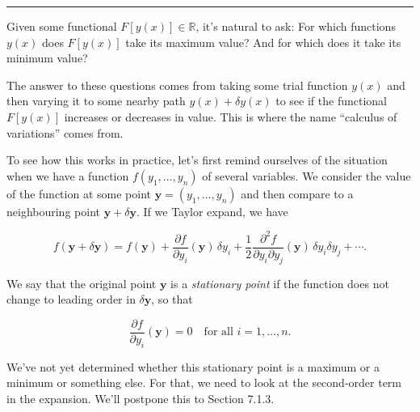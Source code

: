 \documentclass[11pt,a4paper,twoside]{article}
\newcommand{\pnum}[1]{\makebox[0pt][r]{\scriptsize\textbf{[#1]}\hspace{0.7em}}}
\begin{document}
\setcounter{page}{156}



\par\vspace{0.6em}\hrule\vspace{0.8em}

\noindent\pnum{1}Given some functional $F[y(x)]\in\mathbb{R}$, it's natural to ask: For which functions $y(x)$ does $F[y(x)]$ take its maximum value? And for which does it take its minimum value?




\noindent\pnum{2}The answer to these questions comes from taking some trial function $y(x)$ and then varying it to some nearby path $y(x)+\delta y(x)$ to see if the functional $F[y(x)]$ increases or decreases in value. This is where the name ``calculus of variations'' comes from.



\noindent\pnum{3}To see how this works in practice, let's first remind ourselves of the situation when we have a function $f(y_1,\ldots,y_n)$ of several variables. We consider the value of the function at some point $\mathbf{y}=(y_1,\ldots,y_n)$ and then compare to a neighbouring point $\mathbf{y}+\delta\mathbf{y}$. If we Taylor expand, we have

\begin{equation}
    f(\mathbf{y}+\delta\mathbf{y})=f(\mathbf{y})+\frac{\partial f}{\partial y_i}(\mathbf{y})\,\delta y_i+\frac12\frac{\partial^2 f}{\partial y_i\partial y_j}(\mathbf{y})\,\delta y_i\delta y_j+\cdots .\tag{7.5}
\end{equation}

\noindent\pnum{4}We say that the original point $\mathbf{y}$ is a \textit{stationary point} if the function does not change to leading order in $\delta\mathbf{y}$, so that

\begin{equation}
    \frac{\partial f}{\partial y_i}(\mathbf{y})=0\quad\text{for all }i=1,\ldots,n.\tag{7.6}
\end{equation}

\noindent\pnum{5}We've not yet determined whether this stationary point is a maximum or a minimum or something else. For that, we need to look at the second-order term in the expansion. We'll postpone this to Section 7.1.3.
\end{document}
